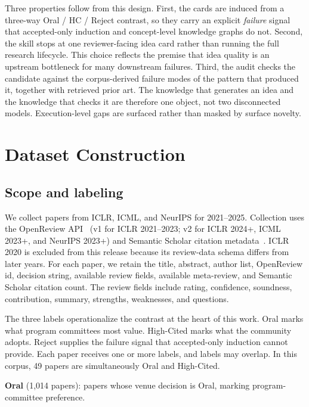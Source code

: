 \documentclass[10pt,a4paper]{article}
\begin{document}
Three properties follow from this design. First, the cards are induced from a three-way Oral / HC / Reject contrast, so they carry an explicit \emph{failure} signal that accepted-only induction and concept-level knowledge graphs do not. Second, the skill stops at one reviewer-facing idea card rather than running the full research lifecycle. This choice reflects the premise that idea quality is an upstream bottleneck for many downstream failures. Third, the audit checks the candidate against the corpus-derived failure modes of the pattern that produced it, together with retrieved prior art. The knowledge that generates an idea and the knowledge that checks it are therefore one object, not two disconnected models. Execution-level gaps are surfaced rather than masked by surface novelty.

\section{Dataset Construction}
\label{sec:data}

\subsection{Scope and labeling}

We collect papers from ICLR, ICML, and NeurIPS for 2021--2025. Collection uses the OpenReview API~\cite{openreview_api} (v1 for ICLR 2021--2023; v2 for ICLR 2024+, ICML 2023+, and NeurIPS 2023+) and Semantic Scholar citation metadata~\cite{semantic_scholar_api}. ICLR 2020 is excluded from this release because its review-data schema differs from later years. For each paper, we retain the title, abstract, author list, OpenReview id, decision string, available review fields, available meta-review, and Semantic Scholar citation count. The review fields include rating, confidence, soundness, contribution, summary, strengths, weaknesses, and questions.

The three labels operationalize the contrast at the heart of this work. Oral marks what program committees most value. High-Cited marks what the community adopts. Reject supplies the failure signal that accepted-only induction cannot provide. Each paper receives one or more labels, and labels may overlap. In this corpus, 49 papers are simultaneously Oral and High-Cited.

\textbf{\textcolor{cblue}{Oral}} (1{,}014 papers): papers whose venue decision is Oral, marking program-committee preference.
\end{document}
